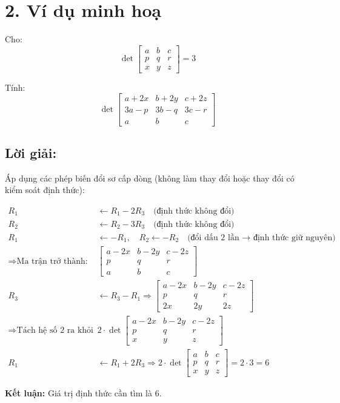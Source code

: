 \documentclass[a4paper,12pt]{article}
\begin{document}
    \section*{2. Ví dụ minh hoạ}
    Cho:
    \[
    \operatorname{det} \begin{bmatrix}
        a & b & c \\
        p & q & r \\
        x & y & z
    \end{bmatrix} = 3
    \]

    Tính:
    \[
    \operatorname{det} \begin{bmatrix}
        a + 2x & b + 2y & c + 2z \\
        3a - p & 3b - q & 3c - r \\
        a & b & c
    \end{bmatrix}
    \]

    \subsection*{Lời giải:}

    Áp dụng các phép biến đổi sơ cấp dòng (không làm thay đổi hoặc thay đổi có kiểm soát định thức):

    \begin{align*}
        R_1 &\leftarrow R_1 - 2R_3 \quad \text{(định thức không đổi)} \\
        R_2 &\leftarrow R_2 - 3R_3 \quad \text{(định thức không đổi)} \\
        R_1 &\leftarrow -R_1,\quad R_2 \leftarrow -R_2 \quad \text{(đổi dấu 2 lần → định thức giữ nguyên)} \\
        \Rightarrow \text{Ma trận trở thành: } &
        \begin{bmatrix}
            a - 2x & b - 2y & c - 2z \\
            p & q & r \\
            a & b & c
        \end{bmatrix} \\
        R_3 &\leftarrow R_3 - R_1 \Rightarrow
        \begin{bmatrix}
            a - 2x & b - 2y & c - 2z \\
            p & q & r \\
            2x & 2y & 2z
        \end{bmatrix} \\
        \Rightarrow \text{Tách hệ số 2 ra khỏi hàng 3: } &
        2 \cdot \operatorname{det} \begin{bmatrix}
            a - 2x & b - 2y & c - 2z \\
            p & q & r \\
            x & y & z
        \end{bmatrix} \\
        R_1 &\leftarrow R_1 + 2R_3 \Rightarrow
        2 \cdot \operatorname{det} \begin{bmatrix}
            a & b & c \\
            p & q & r \\
            x & y & z
        \end{bmatrix} = 2 \cdot 3 = 6
    \end{align*}

    \textbf{Kết luận:} Giá trị định thức cần tìm là 6.
\end{document}
